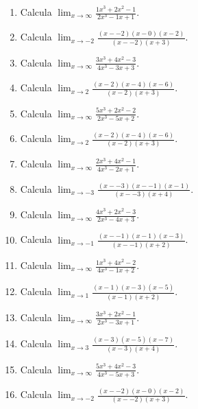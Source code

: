 \documentclass[11pt,a4paper]{article}
\begin{document}
\begin{enumerate}[label=\textbf{E\arabic*.},start=261]

\item Calcula $\displaystyle\lim_{x\to\infty}\frac{1x^3+2x^2-1}{2x^3-1x+1}$. 

\item Calcula $\displaystyle\lim_{x\to -2}\frac{(x--2)(x-0)(x-2)}{(x--2)(x+3)}$. 

\item Calcula $\displaystyle\lim_{x\to\infty}\frac{3x^3+4x^2-3}{4x^3-3x+3}$. 

\item Calcula $\displaystyle\lim_{x\to 2}\frac{(x-2)(x-4)(x-6)}{(x-2)(x+3)}$. 

\item Calcula $\displaystyle\lim_{x\to\infty}\frac{5x^3+2x^2-2}{2x^3-5x+2}$. 

\item Calcula $\displaystyle\lim_{x\to 2}\frac{(x-2)(x-4)(x-6)}{(x-2)(x+3)}$. 

\item Calcula $\displaystyle\lim_{x\to\infty}\frac{2x^3+4x^2-1}{4x^3-2x+1}$. 

\item Calcula $\displaystyle\lim_{x\to -3}\frac{(x--3)(x--1)(x-1)}{(x--3)(x+4)}$. 

\item Calcula $\displaystyle\lim_{x\to\infty}\frac{4x^3+2x^2-3}{2x^3-4x+3}$. 

\item Calcula $\displaystyle\lim_{x\to -1}\frac{(x--1)(x-1)(x-3)}{(x--1)(x+2)}$. 

\item Calcula $\displaystyle\lim_{x\to\infty}\frac{1x^3+4x^2-2}{4x^3-1x+2}$. 

\item Calcula $\displaystyle\lim_{x\to 1}\frac{(x-1)(x-3)(x-5)}{(x-1)(x+2)}$. 

\item Calcula $\displaystyle\lim_{x\to\infty}\frac{3x^3+2x^2-1}{2x^3-3x+1}$. 

\item Calcula $\displaystyle\lim_{x\to 3}\frac{(x-3)(x-5)(x-7)}{(x-3)(x+4)}$. 

\item Calcula $\displaystyle\lim_{x\to\infty}\frac{5x^3+4x^2-3}{4x^3-5x+3}$. 

\item Calcula $\displaystyle\lim_{x\to -2}\frac{(x--2)(x-0)(x-2)}{(x--2)(x+3)}$. 


\end{enumerate}
\end{document}
